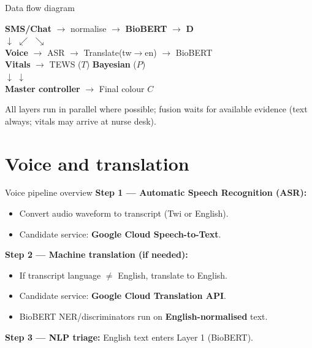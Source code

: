 \documentclass[aspectratio=169,11pt]{beamer}
\newcommand{\bcol}[2][blue!70!black]{\textcolor{#1}{#2}}
\begin{document}
\begin{frame}{Data flow diagram}
	\begin{center}
		\footnotesize
		\textbf{SMS/Chat} $\rightarrow$ normalise $\rightarrow$ \textbf{BioBERT} $\rightarrow$ $\mathbf{D}$ \\
		$\downarrow$ \hspace{2em} $\swarrow$ \hspace{2em} $\searrow$ \\
		\textbf{Voice} $\rightarrow$ ASR $\rightarrow$ Translate(tw$\rightarrow$en) $\rightarrow$ BioBERT \\
		\vspace{0.3em}
		\textbf{Vitals} $\rightarrow$ TEWS ($T$) \hspace{1em} \textbf{Bayesian} ($P$) \\
		\vspace{0.3em}
		$\downarrow$ \hspace{4em} $\downarrow$ \\
		\hspace{2em} \textbf{Master controller} $\rightarrow$ \bcol[triageOrange]{Final colour $C$}
	\end{center}

	\vspace{0.3em}
	All layers run in parallel where possible; fusion waits for available evidence (text always; vitals may arrive at nurse desk).
\end{frame}

\section{Voice and translation}

\begin{frame}{Voice pipeline overview}
	\textbf{Step 1 --- Automatic Speech Recognition (ASR):}
	\begin{itemize}
		\item Convert audio waveform to transcript (Twi or English).
		\item Candidate service: \textbf{Google Cloud Speech-to-Text}.
	\end{itemize}

	\textbf{Step 2 --- Machine translation (if needed):}
	\begin{itemize}
		\item If transcript language $\neq$ English, translate to English.
		\item Candidate service: \textbf{Google Cloud Translation API}.
		\item BioBERT NER/discriminators run on \textbf{English-normalised} text.
	\end{itemize}

	\textbf{Step 3 --- NLP triage:} English text enters Layer 1 (BioBERT).
\end{frame}
\end{document}
